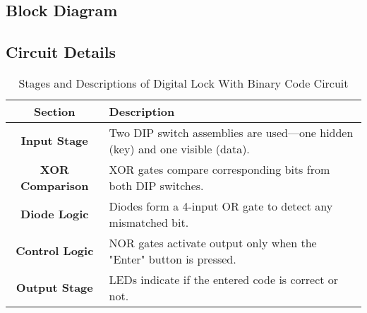\begin{table}[h!]
\subsection{Block Diagram}
\centering
\caption{Stages and Functions of Digital Lock With Binary Code Circuit}
\end{table}

\begin{table}[h!]
\subsection{Circuit Details}
\begin{tabular}{|c|p{10cm}|}
\hline
\textbf{Section} & \textbf{Description} \\ \hline
\textbf{Input Stage} & Two DIP switch assemblies are used—one hidden (key) and one visible (data). \\ \hline
\textbf{XOR Comparison} & XOR gates compare corresponding bits from both DIP switches. \\ \hline
\textbf{Diode Logic} & Diodes form a 4-input OR gate to detect any mismatched bit.\\ \hline
\textbf{Control Logic} & NOR gates activate output only when the "Enter" button is pressed. \\ \hline
\textbf{Output Stage} & LEDs indicate if the entered code is correct or not. \\ \hline
\end{tabular}
\centering
\caption{Stages and Descriptions of Digital Lock With Binary Code Circuit}
\end{table}

